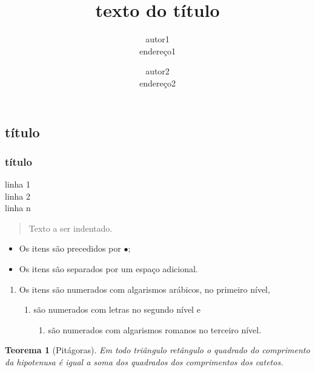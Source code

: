 \documentclass[12pt, a4paper]{article}
\newtheorem{teo}{Teorema}[section]
\begin{document}
  \tableofcontents
  \title{texto do t\'itulo}
  \author{autor1 \cite{TESTE} \\endereço1 \cite{kopka-daly} \and autor2\\endereço2}
  \printbibliography
  \maketitle
    \subsection{t\'itulo} \subsubsection{t\'itulo}
  \begin{center}
    linha 1 \\ linha 2 \\ linha n
  \end{center}
  \begin{quote}
    Texto a ser indentado.
  \end{quote}
  \begin{itemize}
    \item Os itens
    s\~ao precedidos por $\bullet$;
    \item Os itens
    s\~ao separados por um espaço adicional.
  \end{itemize}
  \begin{enumerate}
    \item Os itens
    s\~ao numerados com algarismos arábicos, no primeiro n\'ivel,
  \begin{enumerate}
    \item
    s\~ao numerados com letras no segundo n\'ivel e
  \begin{enumerate}
    \item
    s\~ao numerados com algarismos romanos no terceiro n\'ivel.
  \end{enumerate}
  \end{enumerate}
  \end{enumerate}
  \begin{teo}[Pitágoras] 
  Em todo tri\^angulo ret\^angulo o quadrado do comprimento da hipotenusa \'e igual a soma dos quadrados dos comprimentos dos catetos.
\end{teo}
\end{document}
